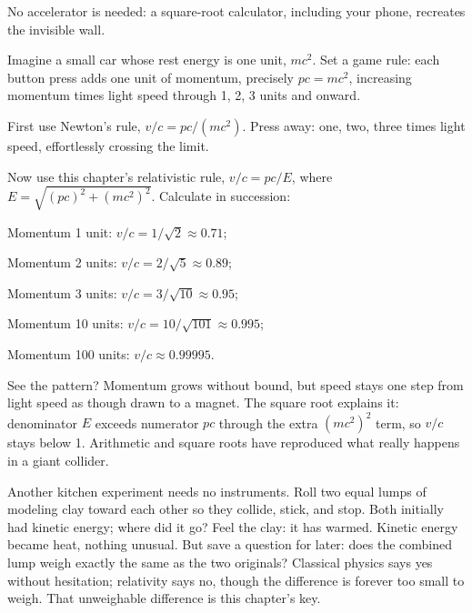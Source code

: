 \begin{experiment}
No accelerator is needed: a square-root calculator, including your phone, recreates the invisible wall.

Imagine a small car whose rest energy is one unit, \(mc^{2}\). Set a game rule: each button press adds one unit of momentum, precisely \(pc=mc^{2}\), increasing momentum times light speed through 1, 2, 3 units and onward.

First use Newton's rule, \(v/c=pc/(mc^{2})\). Press away: one, two, three times light speed, effortlessly crossing the limit.

Now use this chapter's relativistic rule, \(v/c=pc/E\), where \(E=\sqrt{(pc)^{2}+(mc^{2})^{2}}\). Calculate in succession:

Momentum 1 unit: \(v/c=1/\sqrt{2}\approx0.71\);

Momentum 2 units: \(v/c=2/\sqrt{5}\approx0.89\);

Momentum 3 units: \(v/c=3/\sqrt{10}\approx0.95\);

Momentum 10 units: \(v/c=10/\sqrt{101}\approx0.995\);

Momentum 100 units: \(v/c\approx0.99995\).

See the pattern? Momentum grows without bound, but speed stays one step from light speed as though drawn to a magnet. The square root explains it: denominator \(E\) exceeds numerator \(pc\) through the extra \((mc^{2})^{2}\) term, so \(v/c\) stays below 1. Arithmetic and square roots have reproduced what really happens in a giant collider.
\end{experiment}

\begin{mainline}
Another kitchen experiment needs no instruments. Roll two equal lumps of modeling clay toward each other so they collide, stick, and stop. Both initially had kinetic energy; where did it go? Feel the clay: it has warmed. Kinetic energy became heat, nothing unusual. But save a question for later: does the combined lump weigh exactly the same as the two originals? Classical physics says yes without hesitation; relativity says no, though the difference is forever too small to weigh. That unweighable difference is this chapter's key.
\end{mainline}


